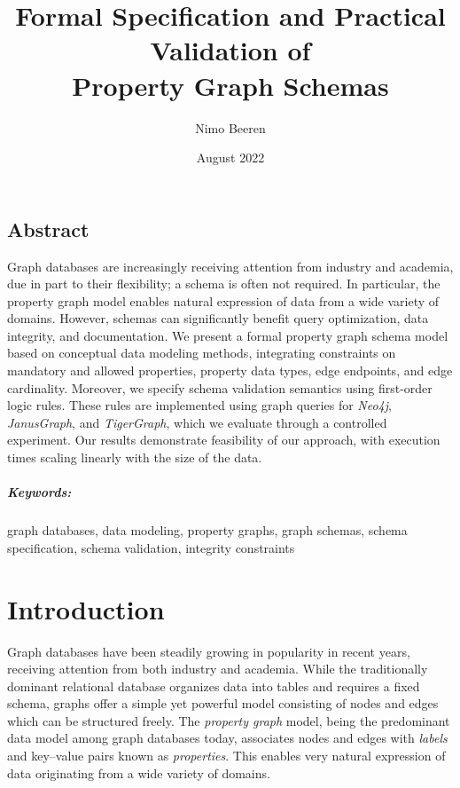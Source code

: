 \documentclass{report}
\title{Formal Specification and Practical Validation of\\Property Graph Schemas}
\author{Nimo Beeren}
\date{August 2022}
\theoremstyle{definition}
\begin{document}


\renewcommand{\thepage}{\roman{page}}

\section*{Abstract}

Graph databases are increasingly receiving attention from industry and academia, due in part to their flexibility; a schema is often not required. In particular, the property graph model enables natural expression of data from a wide variety of domains. However, schemas can significantly benefit query optimization, data integrity, and documentation. We present a formal property graph schema model based on conceptual data modeling methods, integrating constraints on mandatory and allowed properties, property data types, edge endpoints, and edge cardinality. Moreover, we specify schema validation semantics using first-order logic rules. These rules are implemented using graph queries for \emph{Neo4j}, \emph{JanusGraph}, and \emph{TigerGraph}, which we evaluate through a controlled experiment. Our results demonstrate feasibility of our approach, with execution times scaling linearly with the size of the data.

\paragraph{Keywords:} graph databases, data modeling, property graphs, graph schemas, schema specification, schema validation, integrity constraints

\tableofcontents
\listoffigures
\listoftables
\lstlistoflistings
{}

\chapter{Introduction}
\setcounter{page}{1}
\renewcommand{\thepage}{\arabic{page}}

Graph databases have been steadily growing in popularity in recent years, receiving attention from both industry and academia. While the traditionally dominant relational database organizes data into tables and requires a fixed schema, graphs offer a simple yet powerful model consisting of nodes and edges which can be structured freely. The \emph{property graph} model, being the predominant data model among graph databases today, associates nodes and edges with \emph{labels} and key--value pairs known as \emph{properties}. This enables very natural expression of data originating from a wide variety of domains.
\end{document}
